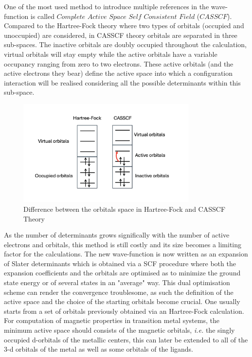 \documentclass[12pt]{report}
\numberwithin{equation}{section}
\begin{document}
One of the most used method to introduce multiple references in the wave-function is called $Complete$ $Active$ $Space$ $Self$ $Consistent$ $Field$ ($CASSCF$). 
Compared to the Hartree-Fock theory where two types of orbitals (occupied and unoccupied) are considered, in CASSCF theory orbitals are separated in three sub-spaces. The inactive orbitals are doubly occupied throughout the calculation, virtual orbitals will stay empty while the active orbitals have a variable occupancy ranging from zero to two electrons.
These active orbitals (and the active electrons they bear) define the active space into which a configuration interaction will be realised considering all the possible determinants within this sub-space. 
\begin{figure}
    \centering
    \includegraphics[width=0.8\textwidth]{Images/EspaceCAS.png}
    \caption{Difference between the orbitals space in Hartree-Fock and CASSCF Theory}
    \label{CAS}
\end{figure}
As the number of determinants grows significally with the number of active electrons and orbitals,  this method is still costly and its size becomes a limiting factor for the calculations.
The new wave-function is now written as an expansion of Slater determinants which is obtained via a SCF procedure where both the expansion coefficients and the orbitals are optimised as to minimize the ground state energy or of several states in an "average" way. 
This dual optimisation scheme can render the convergence troublesome, as such the definition of the active space and the choice of the starting orbitals become crucial.
One usually starts from a set of orbitals previously obtained via an Hartree-Fock calculation.
For computation of magnetic properties in transition metal systems, the minimum active space should consists of the magnetic orbitals, \textit{i.e.} the singly occupied d-orbitals of the metallic centers, this can later be extended to all of the 3-d orbitals of the metal as well as some orbitals of the ligands.
\end{document}
